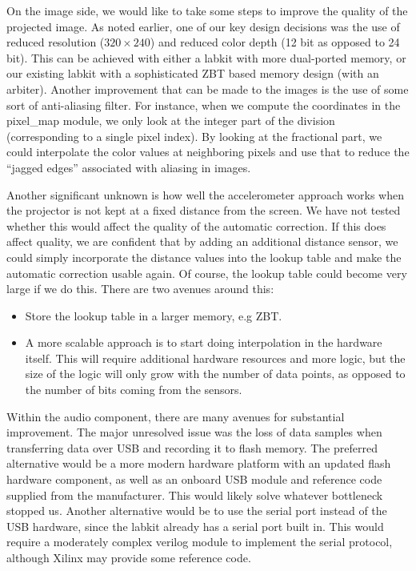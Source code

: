 \documentclass{article}
\begin{document}
On the image side, we would like to take some steps to improve the quality of the projected image.
As noted earlier, one of our key design decisions was the use of reduced resolution ($320 \times 240$) and reduced color depth (12 bit as opposed to 24 bit).
This can be achieved with either a labkit with more dual-ported memory, or our existing labkit with a sophisticated ZBT based memory design (with an arbiter).
Another improvement that can be made to the images is the use of some sort of anti-aliasing filter.
For instance, when we compute the coordinates in the pixel\_map module, we only look at the integer part of the division (corresponding to a single pixel index).
By looking at the fractional part, we could interpolate the color values at neighboring pixels and use that to reduce the ``jagged edges'' associated with aliasing in images.

Another significant unknown is how well the accelerometer approach works when the projector is not kept at a fixed distance from the screen.
We have not tested whether this would affect the quality of the automatic correction.
If this does affect quality, we are confident that by adding an additional distance sensor,
we could simply incorporate the distance values into the lookup table and make the automatic correction usable again.
Of course, the lookup table could become very large if we do this.
There are two avenues around this:
\begin{itemize}
    \item Store the lookup table in a larger memory, e.g ZBT.
    \item A more scalable approach is to start doing interpolation in the hardware itself.
        This will require additional hardware resources and more logic,
        but the size of the logic will only grow with the number of data points,
        as opposed to the number of bits coming from the sensors.
\end{itemize}

Within the audio component, there are many avenues for substantial improvement.
The major unresolved issue was the loss of data samples when transferring data over USB and recording it to flash memory. The preferred alternative would be a more modern hardware platform with an updated flash hardware component, as well as an onboard USB module and reference code supplied from the manufacturer. This would likely solve whatever bottleneck stopped us. Another alternative would be to use the serial port instead of the USB hardware, since the labkit already has a serial port built in. This would require a moderately complex verilog module to implement the serial protocol, although Xilinx may provide some reference code. 
\end{document}
